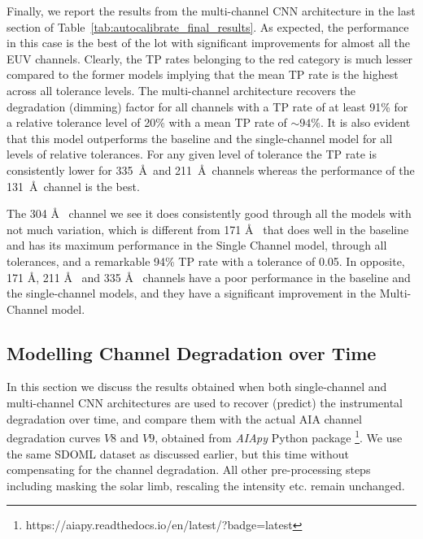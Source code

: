 \documentclass[twocolumn,usenames,dvipsnames]{aastex63}
\begin{document}
Finally, we report the results from the multi-channel CNN architecture in the last section of Table~\ref{tab:autocalibrate_final_results}. As expected, the performance in this case is the best of the lot with significant improvements for almost all the EUV channels. Clearly, the TP rates belonging to the red category is much lesser compared to the former models implying that the mean TP rate is the highest across all tolerance levels. The multi-channel architecture recovers the degradation (dimming) factor for all channels with a TP rate of at least 91\% for a relative tolerance level of 20\% with a mean TP rate of $\sim94\%$. It is also evident that this model outperforms the baseline and the single-channel model for all levels of relative tolerances.  For any given level of tolerance the TP rate is consistently lower for 335~\AA\ and 211~\AA\ channels whereas the performance of the 131~\AA\ channel is the best.

The 304 \AA~ channel we see it does consistently good through all the models with not much variation, which is different from 171 \AA~ that does well in the baseline and has its maximum performance in the Single Channel model, through all tolerances, and a remarkable 94\% TP rate with a tolerance of 0.05.  In opposite, 171 \AA, 211 \AA~ and 335 \AA~ channels have a poor performance in the baseline and the single-channel models, and they have a significant improvement in the Multi-Channel model.


\subsection{Modelling Channel Degradation over Time}
    \label{sec:degradation}
    
In this section we discuss the results obtained when both single-channel and multi-channel CNN architectures are used to recover (predict) the instrumental degradation over time, and compare them with the actual AIA channel degradation curves $V8$ and $V9$, obtained from \textit{AIApy} Python package \footnote{https://aiapy.readthedocs.io/en/latest/?badge=latest}. We use the same SDOML dataset as discussed earlier, but this time without compensating for the channel degradation. All other pre-processing steps including masking the solar limb, rescaling the intensity etc. remain unchanged.  %
\end{document}
